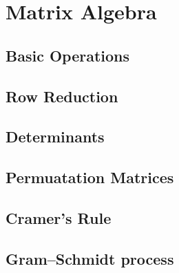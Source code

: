\chapter{Matrix Algebra}

\section{Basic Operations}

\section{Row Reduction}
\section{Determinants}
\section{Permuatation Matrices}
\section{Cramer's Rule}
\section{Gram–Schmidt process}
